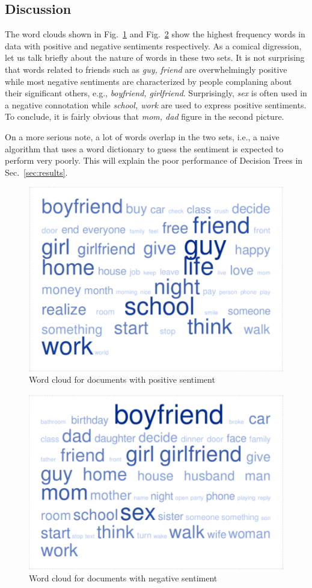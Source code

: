 \documentclass[11pt, letterpaper, conference, final, twocolumn]{ieeeconf}
\begin{document}
\subsection{Discussion}
\label{ssec:discussion}

The word clouds shown in Fig.~\ref{fig:pos_cloud} and Fig.~\ref{fig:neg_cloud} show the highest frequency words in data with positive and negative sentiments respectively. As a comical digression, let us talk briefly about the nature of words in these two sets. It is not surprising that words related to friends such as \emph{guy, friend} are overwhelmingly positive while most negative sentiments are characterized by people complaning about their significant others, e.g., \emph{boyfriend, girlfriend}. Surprisingly, \emph{sex} is often used in a negative connotation while \emph{school, work} are used to express positive sentiments. To conclude, it is fairly obvious that \emph{mom, dad} figure in the second picture.

On a more serious note, a lot of words overlap in the two sets, i.e., a naive algorithm that uses a word dictionary to guess the sentiment is expected to perform very poorly. This will explain the poor performance of Decision Trees in Sec.~\ref{sec:results}.

\begin{figure}[!htp]
\centering
\includegraphics[width= 0.8 \columnwidth]{fig/pos_cloud}
\caption{Word cloud for documents with positive sentiment}
\label{fig:pos_cloud}
\end{figure}
%
\begin{figure}[!htp]
\centering
\includegraphics[width= 0.8 \columnwidth]{fig/neg_cloud}
\caption{Word cloud for documents with negative sentiment}
\label{fig:neg_cloud}
\end{figure}
\end{document}
